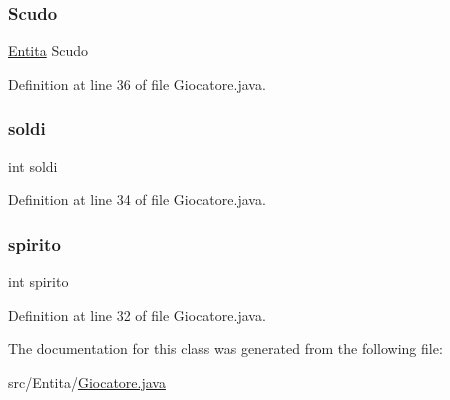 \mbox{\label{class_entita_1_1_giocatore_a07e5f7f5db8ac85356757f54f153bb20}} 
\subsubsection{\texorpdfstring{Scudo}{Scudo}}
{\footnotesize\ttfamily \hyperlink{class_entita_1_1_entita}{Entita} Scudo}



Definition at line 36 of file Giocatore.\+java.

\mbox{\label{class_entita_1_1_giocatore_a4ab2b490b2927b4d21ee663f63f81bd6}} 
\subsubsection{\texorpdfstring{soldi}{soldi}}
{\footnotesize\ttfamily int soldi}



Definition at line 34 of file Giocatore.\+java.

\mbox{\label{class_entita_1_1_giocatore_a531fc785df2ee9bd58da74a801e766c4}} 
\subsubsection{\texorpdfstring{spirito}{spirito}}
{\footnotesize\ttfamily int spirito}



Definition at line 32 of file Giocatore.\+java.



The documentation for this class was generated from the following file\+:\begin{DoxyCompactItemize}
\item 
src/\+Entita/\hyperlink{_giocatore_8java}{Giocatore.\+java}\end{DoxyCompactItemize}
